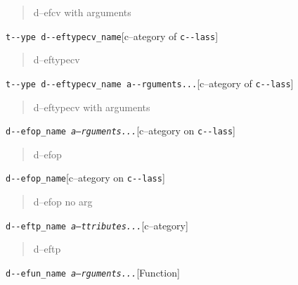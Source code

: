 \documentclass{book}
\begin{document}
\begin{titlepage}
%
\begin{quote}
\unskip{\parskip=0pt\noindent}%
d--efcv with arguments
\end{quote}

\noindent\texttt{t{-}{-}ype d{-}{-}eftypecv\_name}\hfill[c--ategory of \texttt{c{-}{-}lass}]



%
\begin{quote}
\unskip{\parskip=0pt\noindent}%
d--eftypecv
\end{quote}

\noindent\texttt{t{-}{-}ype d{-}{-}eftypecv\_name a{-}{-}rguments...}\hfill[c--ategory of \texttt{c{-}{-}lass}]



%
\begin{quote}
\unskip{\parskip=0pt\noindent}%
d--eftypecv with arguments
\end{quote}

\noindent\texttt{d{-}{-}efop\_name \EmbracOn{}\textnormal{\textsl{a--rguments...}}\EmbracOff{}}\hfill[c--ategory on \texttt{c{-}{-}lass}]



%
\begin{quote}
\unskip{\parskip=0pt\noindent}%
d--efop
\end{quote}

\noindent\texttt{d{-}{-}efop\_name}\hfill[c--ategory on \texttt{c{-}{-}lass}]



%
\begin{quote}
\unskip{\parskip=0pt\noindent}%
d--efop no arg
\end{quote}

\noindent\texttt{d{-}{-}eftp\_name \EmbracOn{}\textnormal{\textsl{a--ttributes...}}\EmbracOff{}}\hfill[c--ategory]



%
\begin{quote}
\unskip{\parskip=0pt\noindent}%
d--eftp
\end{quote}

\noindent\texttt{d{-}{-}efun\_name \EmbracOn{}\textnormal{\textsl{a--rguments...}}\EmbracOff{}}\hfill[Function]




\end{titlepage}
\end{document}
